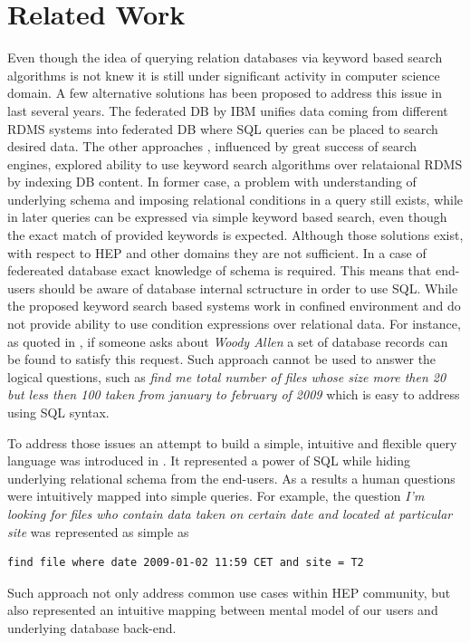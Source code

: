 \documentclass[a4paper]{jpconf}
\begin{document}
\section{Related Work\label{RelatedWork}}
Even though the idea of querying relation databases via keyword based search
algorithms is not knew it is still under significant activity in computer
science domain. A few alternative solutions has been proposed to address this issue
in last several years. The federated DB \cite{FedDB} by IBM unifies data coming 
from different RDMS systems into federated DB where SQL queries can be placed to 
search desired data. The other approaches \cite{DBXplorer, QueryAnswer}, influenced by 
great success of search engines, explored ability to use keyword search algorithms 
over relataional RDMS by indexing DB content. In former case, a problem with understanding 
of underlying schema and imposing relational conditions in a query still exists, while 
in later queries can be expressed via simple keyword based search, even though the exact match
of provided keywords is expected. Although those solutions exist,
with respect to HEP and other domains they are not sufficient.
In a case of federeated database exact knowledge of schema is required. This means
that end-users should be aware of database internal sctructure in order to use SQL.
While the proposed keyword search based systems
work in confined environment and do not provide ability to use condition expressions
over relational data. For instance, as quoted in \cite{QueryAnswer}, if someone asks about 
{\it Woody Allen} a set of database records can be found to satisfy this request.
Such approach cannot be used to answer the logical questions, such as 
{\it find me total number of files whose size more then 20 but less then 100 taken from january
to february of 2009} which is easy to address using SQL syntax. 

To address those issues
an attempt to build a simple, intuitive and flexible query language was introduced
in \cite{DBS-QL, AMI}.
It represented a power of SQL while
hiding underlying relational schema from the end-users. As a results
a human questions were intuitively mapped into simple queries. For example,
the question
{\it I'm looking for files who contain data taken on certain date and located at
particular site} was represented as simple as \cite{DBS-QL}
\begin{verbatim}
find file where date 2009-01-02 11:59 CET and site = T2
\end{verbatim}
Such approach not only address common use cases within HEP community, but also
represented an intuitive mapping between mental model of our users and 
underlying database back-end.
\end{document}
